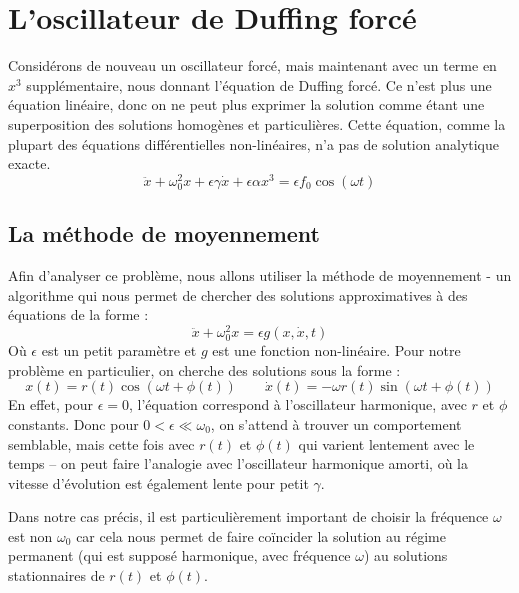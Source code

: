 \chapter{L'oscillateur de Duffing forcé}
%
Considérons de nouveau un oscillateur forcé, mais maintenant avec un terme en $x^3$ supplémentaire, nous donnant l'équation de Duffing forcé. Ce n'est plus une équation linéaire, donc on ne peut plus exprimer la solution comme étant une superposition des solutions homogènes et particulières. Cette équation, comme la plupart des équations différentielles non-linéaires, n'a pas de solution analytique exacte.
%
\begin{equation}
    \ddot{x} + \omega_0^2 x + \epsilon \gamma \dot{x} + \epsilon \alpha x^3 = \epsilon f_0 \cos(\omega t)
    \label{eq:duffing}
\end{equation}
%
\section{La méthode de moyennement}
%
Afin d'analyser ce problème, nous allons utiliser la méthode de 
moyennement \cite{rand_lecture_2012} - un algorithme %
qui nous permet de chercher des solutions approximatives à des équations de la forme :
\begin{equation}
    \ddot{x} + \omega_0^2 x = \epsilon g(x, \dot{x}, t)
\end{equation}
Où $\epsilon$ est un petit paramètre et $g$ est une fonction non-linéaire. Pour notre problème en particulier, on cherche des solutions sous la forme :
\begin{equation}
    x(t) = r(t)\cos(\omega t + \phi(t)) \qquad \dot{x}(t) =  -\omega r(t)\sin(\omega t + \phi(t))
    \label{eq:duff_xxdot}
\end{equation}
%
En effet, pour $\epsilon=0$, l'équation correspond à l'oscillateur harmonique, avec $r$ et $\phi$ constants.
Donc pour $0 < \epsilon \ll \omega_0$, on s'attend à trouver un comportement semblable, mais cette fois avec $r(t)$ et $\phi(t)$ 
qui varient lentement avec le temps – on peut faire l'analogie avec l'oscillateur harmonique amorti, où la vitesse d'évolution est également lente pour petit $\gamma$.
%

Dans notre cas précis, il est particulièrement important de choisir la fréquence $\omega$ est non $\omega_0$ car cela nous permet de faire coïncider la solution au régime permanent (qui est supposé harmonique, avec fréquence $\omega$)
au solutions stationnaires de $r(t)$ et $\phi(t)$. 

